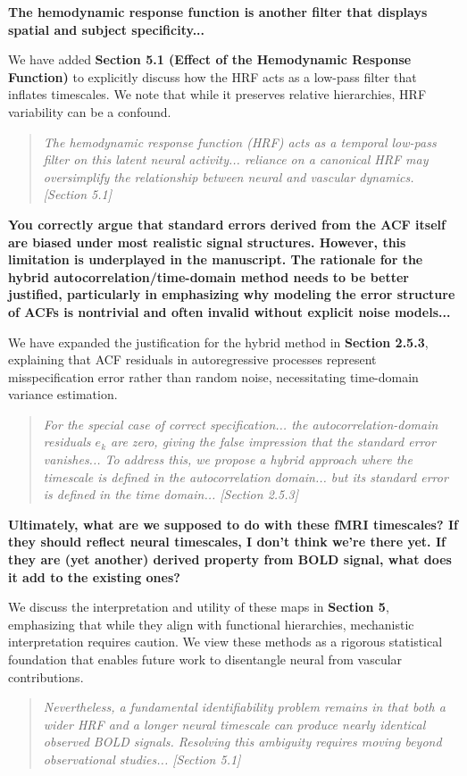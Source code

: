 \documentclass[docs/main.tex]{subfiles}
\newcommand{\reviewercomment}[1]{\vspace{0.3cm}\noindent\textbf{#1}\vspace{0.15cm}}
\newcommand{\manuscriptquote}[1]{\begin{quote}\textit{#1}\end{quote}}
\begin{document}
\reviewercomment{The hemodynamic response function is another filter that displays spatial and subject specificity...}

We have added \textbf{Section 5.1 (Effect of the Hemodynamic Response Function)} to explicitly discuss how the HRF acts as a low-pass filter that inflates timescales. We note that while it preserves relative hierarchies, HRF variability can be a confound.

\manuscriptquote{The hemodynamic response function (HRF) acts as a temporal low-pass filter on this latent neural activity... reliance on a canonical HRF may oversimplify the relationship between neural and vascular dynamics. [Section 5.1]}

\reviewercomment{You correctly argue that standard errors derived from the ACF itself are biased under most realistic signal structures. However, this limitation is underplayed in the manuscript. The rationale for the hybrid autocorrelation/time-domain method needs to be better justified, particularly in emphasizing why modeling the error structure of ACFs is nontrivial and often invalid without explicit noise models...}

We have expanded the justification for the hybrid method in \textbf{Section 2.5.3}, explaining that ACF residuals in autoregressive processes represent misspecification error rather than random noise, necessitating time-domain variance estimation.

\manuscriptquote{For the special case of correct specification... the autocorrelation-domain residuals $e_k$ are zero, giving the false impression that the standard error vanishes... To address this, we propose a hybrid approach where the timescale is defined in the autocorrelation domain... but its standard error is defined in the time domain... [Section 2.5.3]}

\reviewercomment{Ultimately, what are we supposed to do with these fMRI timescales? If they should reflect neural timescales, I don't think we're there yet. If they are (yet another) derived property from BOLD signal, what does it add to the existing ones?}

We discuss the interpretation and utility of these maps in \textbf{Section 5}, emphasizing that while they align with functional hierarchies, mechanistic interpretation requires caution. We view these methods as a rigorous statistical foundation that enables future work to disentangle neural from vascular contributions.

\manuscriptquote{Nevertheless, a fundamental identifiability problem remains in that both a wider HRF and a longer neural timescale can produce nearly identical observed BOLD signals. Resolving this ambiguity requires moving beyond observational studies... [Section 5.1]}
\end{document}
